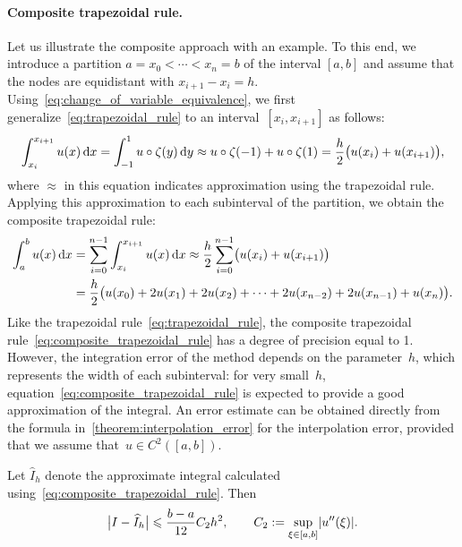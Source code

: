 \paragraph{Composite trapezoidal rule.}
Let us illustrate the composite approach with an example.
To this end,
we introduce a partition $a = x_0 < \dotsb < x_n = b$ of the interval $[a, b]$ and
assume that the nodes are equidistant with $x_{i+1} - x_i = h$.
Using~\eqref{eq:change_of_variable_equivalence},
we first generalize~\eqref{eq:trapezoidal_rule} to an interval~$[x_i, x_{i+1}]$ as follows:
\[
    \int_{x_i}^{x_{i+1}} u(x) \, \mathrm d x
    = \int_{-1}^{1} u \circ \zeta (y) \, \mathrm d y
    \approx u \circ \zeta(-1)  + u \circ \zeta(1)
    = \frac{h}{2} \bigl(u(x_i) + u(x_{i+1})\bigr),
\]
where $\approx$ in this equation indicates approximation using the trapezoidal rule.
Applying this approximation to each subinterval of the partition,
we obtain the composite trapezoidal rule:
\begin{align}
    \notag
    \int_{a}^{b} u(x) \, \mathrm d x
    &= \sum_{i=0}^{n-1} \int_{x_i}^{x_{i+1}} u(x) \, \mathrm d x
    \approx
    \frac{h}{2}\sum_{i=0}^{n-1} \bigl( u(x_i) + u(x_{i+1}) \bigr) \\
    \label{eq:composite_trapezoidal_rule}
    &= \frac{h}{2} \bigl( u(x_0) + 2 u(x_1) + 2 u(x_2) + \dotsb + 2 u(x_{n-2}) + 2 u(x_{n-1}) + u(x_n) \bigr).
\end{align}
Like the trapezoidal rule~\eqref{eq:trapezoidal_rule},
the composite trapezoidal rule~\eqref{eq:composite_trapezoidal_rule} has a degree of precision equal to 1.
However,
the integration error of the method depends on the parameter~$h$,
which represents the width of each subinterval:
for very small~$h$,
equation~\eqref{eq:composite_trapezoidal_rule} is expected to provide a good approximation of the integral.
An error estimate can be obtained directly from the formula in~\cref{theorem:interpolation_error} for the interpolation error,
provided that we assume that~$u \in C^2([a, b])$.

\begin{theorem}
    Let $\widehat I_h$ denote the approximate integral calculated using~\eqref{eq:composite_trapezoidal_rule}.
    Then
    \begin{equation}
        \label{eq:error_bound_trapezoidal}
        \bigl\lvert I - \widehat I_h \bigr\rvert
        \leq \frac{b-a}{12} C_2 h^2,
        \qquad
        C_2 := \sup_{\xi \in [a, b]} \abs*{u''(\xi)}.
    \end{equation}
\end{theorem}

